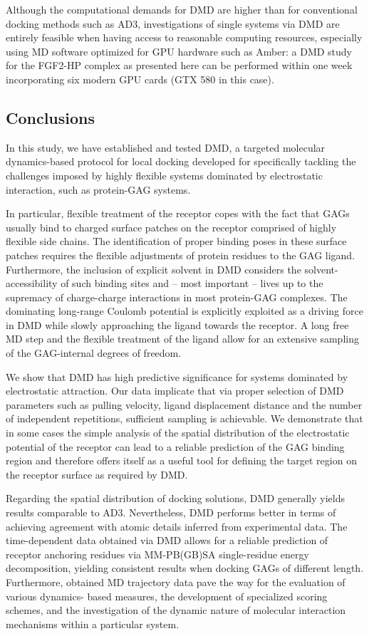 Although the computational demands for DMD are higher than for conventional
docking methods such as AD3, investigations of single systems via DMD are
entirely feasible when having access to reasonable computing resources,
especially using MD software optimized for GPU hardware such as Amber: a DMD
study for the FGF2-HP complex as presented here can be performed within one week
incorporating six modern GPU cards (GTX 580 in this case).

\subsection{Conclusions}

In this study, we have established and tested DMD, a targeted molecular
dynamics-based protocol for local docking developed for specifically tackling
the challenges imposed by highly flexible systems dominated by electrostatic
interaction, such as protein-GAG systems.

In particular, flexible treatment of the receptor copes with the fact that GAGs
usually bind to charged surface patches on the receptor comprised of highly
flexible side chains. The identification of proper binding poses in these
surface patches requires the flexible adjustments of protein residues to the GAG
ligand. Furthermore, the inclusion of explicit solvent in DMD considers the
solvent-accessibility of such binding sites and -- most important -- lives up to
the supremacy of charge-charge interactions in most protein-GAG complexes. The
dominating long-range Coulomb potential is explicitly exploited as a driving
force in DMD while slowly approaching the ligand towards the receptor. A long
free MD step and the flexible treatment of the ligand allow for an extensive
sampling of the GAG-internal degrees of freedom.

We show that DMD has high predictive significance for systems dominated by
electrostatic attraction. Our data implicate that via proper selection of DMD
parameters such as pulling velocity, ligand displacement distance and the number
of independent repetitions, sufficient sampling is achievable. We demonstrate
that in some cases the simple analysis of the spatial distribution of the
electrostatic potential of the receptor can lead to a reliable prediction of the
GAG binding region and therefore offers itself as a useful tool for defining the
target region on the receptor surface as required by DMD.

Regarding the spatial distribution of docking solutions, DMD generally yields
results comparable to AD3. Nevertheless, DMD performs better in terms of
achieving agreement with atomic details inferred from experimental data. The
time-dependent data obtained via DMD allows for a reliable prediction of
receptor anchoring residues via MM-PB(GB)SA single-residue energy decomposition,
yielding consistent results when docking GAGs of different length. Furthermore,
obtained MD trajectory data pave the way for the evaluation of various dynamics-
based measures, the development of specialized scoring schemes, and the
investigation of the dynamic nature of molecular interaction mechanisms within a
particular system.
